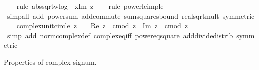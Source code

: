 \begin{isabellebody}
\ \ \isamarkupfalse%
\ {\isacharparenleft}{\kern0pt}rule\ abs{\isacharunderscore}{\kern0pt}sqrt{\isacharunderscore}{\kern0pt}wlog\ {\isacharbrackleft}{\kern0pt}\ x{\isacharequal}{\kern0pt}{\isachardoublequoteopen}Im\ z{\isachardoublequoteclose}{\isacharbrackright}{\kern0pt}{\isacharparenright}{\kern0pt}\isanewline
\ \ \isamarkupfalse%
\ {\isacharparenleft}{\kern0pt}rule\ power{}{\isacharunderscore}{\kern0pt}le{\isacharunderscore}{\kern0pt}imp{\isacharunderscore}{\kern0pt}le{\isacharparenright}{\kern0pt}\isanewline
\ \ \ \isamarkupfalse%
\ {\isacharparenleft}{\kern0pt}simp{\isacharunderscore}{\kern0pt}all\ add{\isacharcolon}{\kern0pt}\ power{}{\isacharunderscore}{\kern0pt}sum\ add{\isachardot}{\kern0pt}commute\ sum{\isacharunderscore}{\kern0pt}squares{\isacharunderscore}{\kern0pt}bound\ real{\isacharunderscore}{\kern0pt}sqrt{\isacharunderscore}{\kern0pt}mult\ {\isacharbrackleft}{\kern0pt}symmetric{\isacharbrackright}{\kern0pt}{\isacharparenright}{\kern0pt}\isanewline
\ \ \isamarkupfalse%
%
\endisatagproof
{\isafoldproof}%
%
\isadelimproof
\isanewline
%
\endisadelimproof
\isanewline
{}\isamarkupfalse%
\ complex{\isacharunderscore}{\kern0pt}unit{\isacharunderscore}{\kern0pt}circle{\isacharcolon}{\kern0pt}\ {\isachardoublequoteopen}z\ {\isasymnoteq}\ {}\ {\isasymLongrightarrow}\ {\isacharparenleft}{\kern0pt}Re\ z\ {\isacharslash}{\kern0pt}\ cmod\ z{\isacharparenright}{\kern0pt}\ {\isacharplus}{\kern0pt}\ {\isacharparenleft}{\kern0pt}Im\ z\ {\isacharslash}{\kern0pt}\ cmod\ z{\isacharparenright}{\kern0pt}\ {\isacharequal}{\kern0pt}\ {}{\isachardoublequoteclose}\isanewline
%
\isadelimproof
\ \ %
\endisadelimproof
%
\isatagproof
{}\isamarkupfalse%
\ {\isacharparenleft}{\kern0pt}simp\ add{\isacharcolon}{\kern0pt}\ norm{\isacharunderscore}{\kern0pt}complex{\isacharunderscore}{\kern0pt}def\ complex{\isacharunderscore}{\kern0pt}eq{\isacharunderscore}{\kern0pt}iff\ power{}{\isacharunderscore}{\kern0pt}eq{\isacharunderscore}{\kern0pt}square\ add{\isacharunderscore}{\kern0pt}divide{\isacharunderscore}{\kern0pt}distrib\ {\isacharbrackleft}{\kern0pt}symmetric{\isacharbrackright}{\kern0pt}{\isacharparenright}{\kern0pt}%
\endisatagproof
{\isafoldproof}%
%
\isadelimproof
%
\endisadelimproof
%
\begin{isamarkuptext}%
Properties of complex signum.%
\end{isamarkuptext}\isamarkuptrue%

\end{isabellebody}
